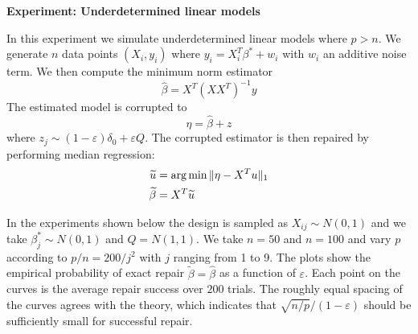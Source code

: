 \documentclass[12pt,pdftex,noinfoline]{imsart}
\DeclareMathOperator*{\argmin}{\arg\min}
\numberwithin{equation}{section}
\theoremstyle{remark}
\def\argmin{\mathop{\text{arg\,min}}}
\let\hat\widehat
\let\tilde\widetilde
\let\epsilon\varepsilon
\begin{document}
\let\epsilon\varepsilon

{\large\bf Experiment: Underdetermined linear models}
\vskip10pt

In this experiment we simulate underdetermined linear models where $p > n$.
We generate $n$ data points $(X_i, y_i)$ where
$y_i = X_i^T \beta^* + w_i$ with $w_i$ an additive noise term. We then compute the minimum norm estimator
\begin{equation}
  \hat\beta = X^T (X X^T)^{-1} y
\end{equation}
The estimated model is corrupted to
\begin{equation}
  \eta = \hat\beta + z
\end{equation}
where $z_j \sim (1-\epsilon) \delta_0 +\epsilon Q$. The corrupted estimator is then repaired by performing median regression:
\begin{align}
  \tilde u &= \argmin \|\eta - X^T u\|_1 \\
  \tilde \beta &= X^T \tilde u
\end{align}

In the experiments shown below the design is sampled as $X_{ij} \sim N(0,1)$ and we take $\beta_j^* \sim N(0,1)$ and $Q = N(1,1)$. We take $n=50$ and $n=100$ and vary $p$ according to $p/n=200/j^2$ with
$j$ ranging from 1 to 9. The plots show the empirical probability of exact repair $\tilde\beta = \hat\beta$ as a function of $\epsilon$. Each point on the curves is the average repair success over $200$ trials.
The roughly equal spacing of the curves agrees with the theory, which indicates that $\sqrt{n/p}/(1-\epsilon)$ should be sufficiently small for successful repair.
\end{document}
